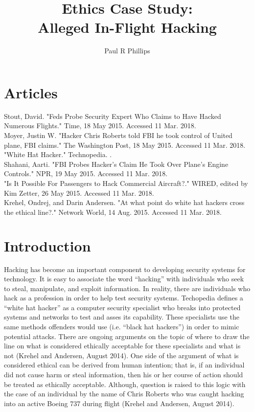 \documentclass[notitlepage,a4paper,12pt]{article}
\author{Paul R Phillips}
\title{Ethics Case Study:\\Alleged In-Flight Hacking}
\begin{document}
\maketitle

\section*{Articles} 

Stout, David. "Feds Probe Security Expert Who Claims to Have Hacked Numerous Flights." Time, 18 May 2015. Accessed 11 Mar. 2018. \\

Moyer, Justin W. "Hacker Chris Roberts told FBI he took control of United plane, FBI claims." The Washington Post, 18 May 2015. Accessed 11 Mar. 2018.\\

"White Hat Hacker." Technopedia. . \\

Shahani, Aarti. "FBI Probes Hacker's Claim He Took Over Plane's Engine Controls." NPR, 19 May 2015. Accessed 11 Mar. 2018. \\

"Is It Possible For Passengers to Hack Commercial Aircraft?." WIRED, edited by Kim Zetter, 26 May 2015. Accessed 11 Mar. 2018. \\

Krehel, Ondrej, and Darin Andersen. "At what point do white hat hackers cross the ethical line?." Network World, 14 Aug. 2015. Accessed 11 Mar. 2018. \\

\section*{Introduction}
Hacking has become an important component to developing security systems for technology. It is easy to associate the word “hacking” with individuals who seek to steal, manipulate, and exploit information. In reality, there are individuals who hack as a profession in order to help test security systems. Techopedia defines a “white hat hacker” as a computer security specialist who breaks into protected systems and networks to test and asses its capability. These specialists use the same methods offenders would use (i.e. “black hat hackers”) in order to mimic potential attacks. There are ongoing arguments on the topic of where to draw the line on what is considered ethically acceptable for these specialists and what is not (Krehel and Andersen, August 2014). One side of the argument of what is considered ethical can be derived from human intention; that is, if an individual did not cause harm or steal information, then his or her course of action should be treated as ethically acceptable. Although, question is raised to this logic with the case of an individual by the name of Chris Roberts who was caught hacking into an active Boeing 737 during flight (Krehel and Andersen, August 2014). 
\end{document}
